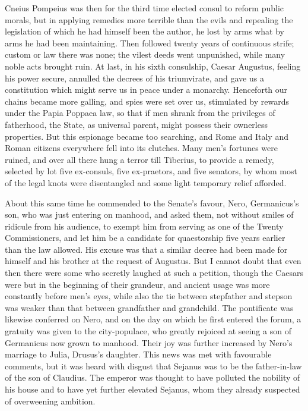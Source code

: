 
Cneius Pompeius was then for the third time elected consul to reform public morals, but in applying remedies more terrible than the evils and repealing the legislation of which he had himself been the author, he lost by arms what by arms he had been maintaining. Then followed twenty years of continuous strife; custom or law there was none; the vilest deeds went unpunished, while many noble acts brought ruin. At last, in his sixth consulship, Caesar Augustus, feeling his power secure, annulled the decrees of his triumvirate, and gave us a constitution which might serve us in peace under a monarchy. Henceforth our chains became more galling, and spies were set over us, stimulated by rewards under the Papia Poppaea law, so that if men shrank from the privileges of fatherhood, the State, as universal parent, might possess their ownerless properties. But this espionage became too searching, and Rome and Italy and Roman citizens everywhere fell into its clutches. Many men's fortunes were ruined, and over all there hung a terror till Tiberius, to provide a remedy, selected by lot five ex-consuls, five ex-praetors, and five senators, by whom most of the legal knots were disentangled and some light temporary relief afforded.


About this same time he commended to the Senate's favour, Nero, Germanicus's son, who was just entering on manhood, and asked them, not without smiles of ridicule from his audience, to exempt him from serving as one of the Twenty Commissioners, and let him be a candidate for quaestorship five years earlier than the law allowed. His excuse was that a similar decree had been made for himself and his brother at the request of Augustus. But I cannot doubt that even then there were some who secretly laughed at such a petition, though the Caesars were but in the beginning of their grandeur, and ancient usage was more constantly before men's eyes, while also the tie between stepfather and stepson was weaker than that between grandfather and grandchild. The pontificate was likewise conferred on Nero, and on the day on which he first entered the forum, a gratuity was given to the city-populace, who greatly rejoiced at seeing a son of Germanicus now grown to manhood. Their joy was further increased by Nero's marriage to Julia, Drusus's daughter. This news was met with favourable comments, but it was heard with disgust that Sejanus was to be the father-in-law of the son of Claudius. The emperor was thought to have polluted the nobility of his house and to have yet further elevated Sejanus, whom they already suspected of overweening ambition.


